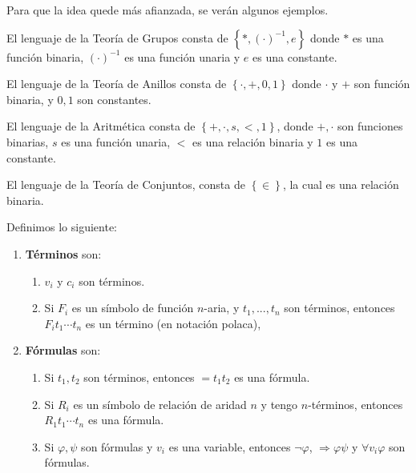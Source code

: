 \documentclass[12pt]{report}
\theoremstyle{largebreak}
\begin{document}
    Para que la idea quede más afianzada, se verán algunos ejemplos.

    \begin{exa}
        El lenguaje de la Teoría de Grupos consta de $\left\{*,(\cdot)^{-1}, e\right\}$ donde $*$ es una función binaria, $(\cdot)^{-1}$ es una función unaria y $e$ es una constante.
    \end{exa}

    \begin{exa}
        El lenguaje de la Teoría de Anillos consta de $\left\{\cdot,+,0,1 \right\}$ donde $\cdot$ y $+$ son función binaria, y $0,1$ son constantes.
    \end{exa}

    \begin{exa}
        El lenguaje de la Aritmética consta de $\left\{+,\cdot,s,<,1 \right\}$, donde $+,\cdot$ son funciones binarias, $s$ es una función unaria, $<$ es una relación binaria y $1$ es una constante.
    \end{exa}

    \begin{exa}
        El lenguaje de la Teoría de Conjuntos, consta de $\left\{\in \right\}$, la cual es una relación binaria.
    \end{exa}

    \begin{mydef}
        Definimos lo siguiente:
        \begin{enumerate}
            \item \textbf{Términos} son:
            \begin{enumerate}
                \item $v_i$ y $c_i$ son términos.
                \item Si $F_i$ es un símbolo de función $n$-aria, y $t_1,...,t_n$ son términos, entonces $F_i t_1\cdots t_n$ es un término (en notación polaca),
            \end{enumerate}
            \item \textbf{Fórmulas} son:
            \begin{enumerate}
                \item Si $t_1,t_2$ son términos, entonces $=t_1t_2$ es una fórmula.
                \item Si $R_i$ es un símbolo de relación de aridad $n$ y tengo $n$-términos, entonces $R_1t_1\cdots t_n$ es una fórmula.
                \item Si $\varphi,\psi$ son fórmulas y $v_i$ es una variable, entonces $\neg\varphi$, $\Rightarrow\varphi\psi$ y $\forall v_i\varphi$ son fórmulas.
            \end{enumerate}
        \end{enumerate}
    \end{mydef}
\end{document}
